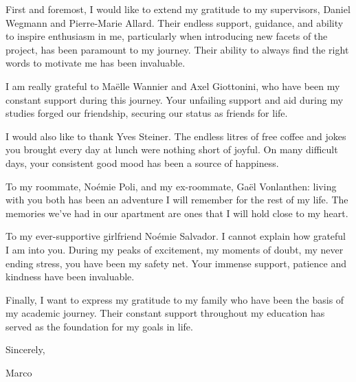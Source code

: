 \documentclass[
11pt, %
oneside, %
english, %
singlespacing, %
headsepline, %
chapterinoneline, %
]{MastersDoctoralThesis} %
\begin{document}
\begin{acknowledgements}\label{sec:acknowledgements}
\addchaptertocentry{\acknowledgementname} %
First and foremost, I would like to extend my gratitude to my supervisors, Daniel Wegmann and Pierre-Marie Allard. Their endless support, guidance, and ability to inspire enthusiasm in me, particularly when introducing new facets of the project, has been paramount to my journey. Their ability to always find the right words to motivate me has been invaluable.

I am really grateful to Maëlle Wannier and Axel Giottonini, who have been my constant support during this journey. Your unfailing support and aid during my studies forged our friendship, securing our status as friends for life. 

I would also like to thank Yves Steiner. The endless litres of free coffee and jokes you brought every day at lunch were nothing short of joyful. On many difficult days, your consistent good mood has been a source of happiness. 

To my roommate, Noémie Poli, and my ex-roommate, Gaël Vonlanthen: living with you both has been an adventure I will remember for the rest of my life. The memories we've had in our apartment are ones that I will hold close to my heart. 

To my ever-supportive girlfriend Noémie Salvador. I cannot explain how grateful I am into you. During my peaks of excitement, my moments of doubt, my never ending stress, you have been my safety net. Your immense support, patience and kindness have been invaluable. 

Finally, I want to express my gratitude to my family who have been the basis of my academic journey. Their constant support throughout my education has served as the foundation for my goals in life.

\begin{flushleft}
	Sincerely, 

Marco
\end{flushleft}
\end{acknowledgements}


\tableofcontents %

\end{document}
